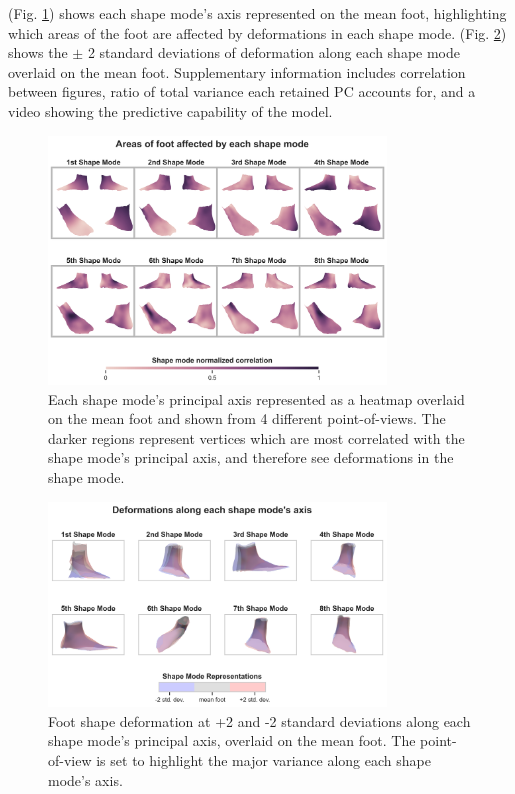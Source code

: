 \documentclass[defaultstyle,11pt]{comps}
\begin{document}
(Fig. \ref{fig:pca_quad}) shows each shape mode's axis represented on the mean foot, highlighting which areas of the foot are affected by deformations in each shape mode.
(Fig. \ref{fig:pca_overlay}) shows the \(\pm\) 2 standard deviations of deformation along each shape mode overlaid on the mean foot.
Supplementary information includes correlation between figures, ratio of total variance each retained PC accounts for, and a video showing the predictive capability of the model.

\begin{figure}
\hypertarget{fig:pca_quad}{%
\centering
\includegraphics[width=0.8\textwidth,height=\textheight]{../fig/SA2/PCQuad.png}
\caption{Each shape mode's principal axis represented as a heatmap overlaid on the mean foot and shown from 4 different point-of-views. The darker regions represent vertices which are most correlated with the shape mode's principal axis, and therefore see deformations in the shape mode.}\label{fig:pca_quad}
}
\end{figure}

\begin{figure}
\hypertarget{fig:pca_overlay}{%
\centering
\includegraphics[width=0.8\textwidth,height=\textheight]{../fig/SA2/PCVAR.png}
\caption{Foot shape deformation at +2 and -2 standard deviations along each shape mode's principal axis, overlaid on the mean foot. The point-of-view is set to highlight the major variance along each shape mode's axis.}\label{fig:pca_overlay}
}
\end{figure}
\end{document}
